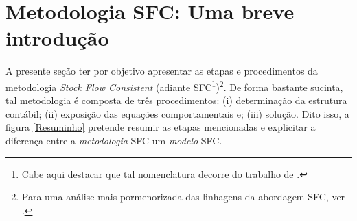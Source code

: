 \section{Metodologia SFC: Uma breve introdução}
\label{IntroSFC}


A presente seção ter por objetivo apresentar as etapas e procedimentos da metodologia \textit{Stock Flow Consistent} (adiante SFC\footnote{Cabe aqui destacar que tal nomenclatura decorre do trabalho de \textcite{dos_santos_keynesian_2006}.})\footnote{Para uma análise mais pormenorizada das linhagens da abordagem SFC, ver \textcite{caverzasi_stock-flow_2013}.}. De forma bastante sucinta, tal metodologia é composta de três procedimentos: (i) determinação da estrutura contábil; (ii) exposição das equações comportamentais e; (iii) solução. Dito isso, a figura \ref{Resuminho} pretende resumir as etapas mencionadas e explicitar a diferença entre a \textit{metodologia} SFC um \textit{modelo} SFC. 

